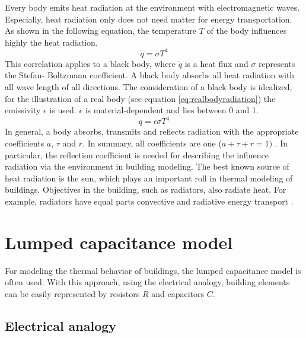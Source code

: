     Every body emits heat radiation at the environment with electromagnetic waves. Especially, heat radiation only does not need matter for energy transportation. As shown in the following equation, the temperature $T$ of the body influences highly the heat radiation.\cite{.2013} 
    \begin{equation}
    \label{eq:radiation}
        \dot{q} = \sigma T^4
    \end{equation}
    This correlation applies to a black body, where $\dot{q}$ is a heat flux and $\sigma$ represents the Stefan- Boltzmann coefficient. A black body absorbs all heat radiation with all wave length of all directions\cite{Griesinger.2019}. The consideration of a black body is idealized, for the illustration of a real body (see equation \ref{eq:realbodyradiation}) the emissivity $\epsilon$ is used. $\epsilon$ is material-dependent and lies between 0 and 1.
    \begin{equation}
    \label{eq:realbodyradiation}
        \dot{q} = \epsilon \sigma T^4
    \end{equation}
    In general, a body absorbs, transmits and reflects radiation with the appropriate coefficients $a$, $\tau$ and $r$. In summary, all coefficients are one ($a + \tau + r = 1)$
    \cite{Baehr.2016}.
    In particular, the reflection coefficient is needed for describing the influence radiation via the environment in building modeling.
    \newline
    The best known source of heat radiation is the sun, which plays an important roll in thermal modeling of buildings. Objectives in the building, such as radiators, also  radiate heat. For example, radiators have equal parts convective and radiative energy transport \cite{Hazyuk.2012}. 
    
\section{Lumped capacitance model}
\label{section:modeling}
For modeling the thermal behavior of buildings, the lumped capacitance model is often used. With this approach, using the electrical analogy, building elements can be easily represented by resistors $R$ and capacitors $C$. \cite{Kramer.2012}

\subsection{Electrical analogy}
\label{electricalanalogy}

